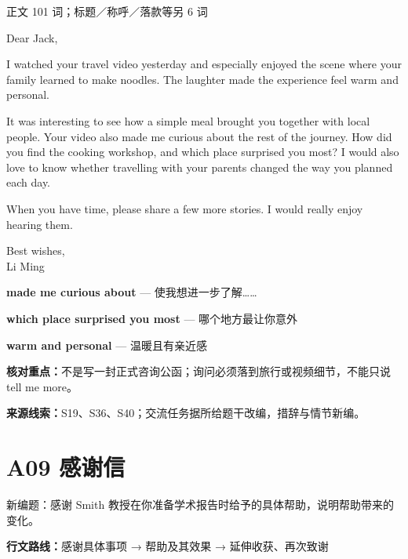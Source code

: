 \documentclass[11pt,a4paper,fontset=macnew]{ctexart}
\newenvironment{example}{\begingroup\fontsize{11}{14.3}\selectfont\setlength{\parskip}{4pt}}{\par\endgroup}
\begin{document}
{\small 正文 101 词；标题／称呼／落款等另 6 词}\par
\begin{example}
\noindent Dear Jack,\par
I watched your travel video yesterday and especially enjoyed the scene where your family learned to make noodles. The laughter made the experience feel warm and personal.

It was interesting to see how a simple meal brought you together with local people. Your video also made me curious about the rest of the journey. How did you find the cooking workshop, and which place surprised you most? I would also love to know whether travelling with your parents changed the way you planned each day.

When you have time, please share a few more stories. I would really enjoy hearing them.

\noindent Best wishes,\\Li Ming\par
\end{example}
\par\vspace{4pt}{\bfseries 好词好句：优先记这三处}\par\nopagebreak
{\small\textbf{made me curious about} — 使我想进一步了解……}\par
{\small\textbf{which place surprised you most} — 哪个地方最让你意外}\par
{\small\textbf{warm and personal} — 温暖且有亲近感}\par
{\small\textbf{核对重点：}不是写一封正式咨询公函；询问必须落到旅行或视频细节，不能只说 tell me more。}\par
{\fontsize{8}{10}\selectfont\textbf{来源线索：}S19、S36、S40；交流任务据所给题干改编，措辞与情节新编。}\par
\clearpage\section*{A09  感谢信}
{\small 新编题：感谢 Smith 教授在你准备学术报告时给予的具体帮助，说明帮助带来的变化。}\par
{\small\textbf{行文路线：}感谢具体事项 → 帮助及其效果 → 延伸收获、再次致谢}\par
\par\vspace{4pt}{\bfseries 可替换模板}\par\nopagebreak
\end{document}
